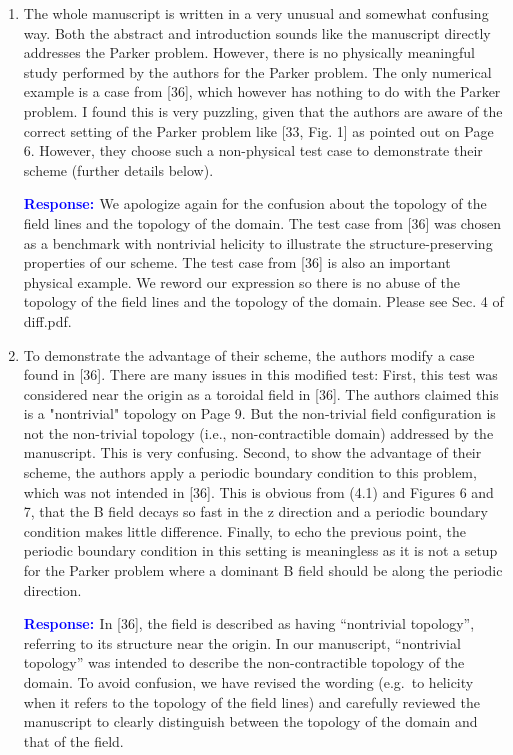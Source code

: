 \documentclass{article}
\theoremstyle{definition}
\newcommand{\rv}[1]{%
  \colorbox{gray!20}{%
    \parbox{0.96\linewidth}{%
      \small #1
    }%
  }%
}
\newcommand{\rp}{\textbf{\textcolor{blue}{Response: }}}
\begin{document}
\begin{enumerate}
\item \rv{The whole manuscript is written in a very unusual and somewhat confusing way. Both the abstract and introduction sounds like the manuscript directly addresses the Parker problem. However, there is no physically meaningful study performed by the authors for the Parker problem. The only numerical example is a case from [36], which however has nothing to do with the Parker problem. I found this is very puzzling, given that the authors are aware of the correct setting of the Parker problem like [33, Fig. 1] as pointed out on Page 6. However, they choose such a non-physical test case to demonstrate their scheme (further details below).}

\rp We apologize again for the confusion about the topology of the field lines and the topology of the domain. The test case from [36] was chosen as a benchmark with nontrivial helicity to illustrate the structure-preserving properties of our scheme. The test case from [36] is also an important physical example. We reword our expression so there is no abuse of the topology of the field lines and the topology of the domain. Please see Sec. 4 of diff.pdf. 

\item \rv{To demonstrate the advantage of their scheme, the authors modify a case found in [36]. There are many issues in this modified test:  
First, this test was considered near the origin as a toroidal field in [36]. The authors claimed this is a "nontrivial" topology on Page 9. But the non-trivial field configuration is not the non-trivial topology (i.e., non-contractible domain) addressed by the manuscript. This is very confusing. Second, to show the advantage of their scheme, the authors apply a periodic boundary condition to this problem, which was not intended in [36]. This is obvious from (4.1) and Figures 6 and 7, that the B field decays so fast in the z direction and a periodic boundary condition makes little difference. Finally, to echo the previous point, the periodic boundary condition in this setting is meaningless as it is not a setup for the Parker problem where a dominant B field should be along the periodic direction.}

\rp In [36], the field is described as having ``nontrivial topology'', referring to its structure near the origin. In our manuscript, ``nontrivial topology'' was intended to describe the non-contractible topology of the domain. To avoid confusion, we have revised the wording (e.g.~to helicity when it refers to the topology of the field lines) and carefully reviewed the manuscript to clearly distinguish between the topology of the domain and that of the field.  


\end{enumerate}
\end{document}
